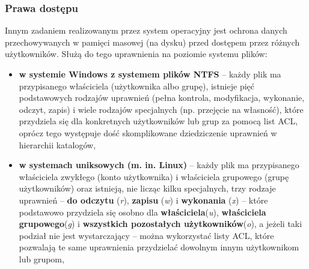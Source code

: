 \subsubsection{Prawa dostępu}

Innym zadaniem realizowanym przez system operacyjny jest ochrona danych przechowywanych w pamięci masowej (na dysku) przed dostępem przez różnych użytkowników. Służą do tego uprawnienia na poziomie systemu plików:
\begin{itemize}
	\item  \textbf{w systemie Windows z systemem plików NTFS} – każdy plik ma przypisanego właściciela (użytkownika albo grupę), istnieje pięć podstawowych rodzajów uprawnień (pełna kontrola, modyfikacja, wykonanie, odczyt, zapis) i wiele rodzajów specjalnych (np. przejęcie na własność), które przydziela się dla konkretnych użytkowników lub grup za pomocą list ACL, oprócz tego występuje dość skomplikowane dziedziczenie uprawnień w hierarchii katalogów,
	\item  \textbf{w systemach uniksowych (m. in. Linux)} – każdy plik ma przypisanego właściciela zwykłego (konto użytkownika) i właściciela grupowego (grupę użytkowników) oraz istnieją, nie licząc kilku specjalnych, trzy rodzaje uprawnień – \textbf{do odczytu} (\textit{r}), \textbf{zapisu} (\textit{w}) i \textbf{wykonania} (\textit{x}) – które podstawowo przydziela się osobno dla \textbf{właściciela}(\textit{u}), \textbf{właściciela grupowego}(\textit{g}) i \textbf{wszystkich pozostałych użytkowników}(\textit{o}), a jeżeli taki podział nie jest wystarczający – można wykorzystać listy ACL, które pozwalają te same uprawnienia przydzielać dowolnym innym użytkownikom lub grupom,
\end{itemize}
